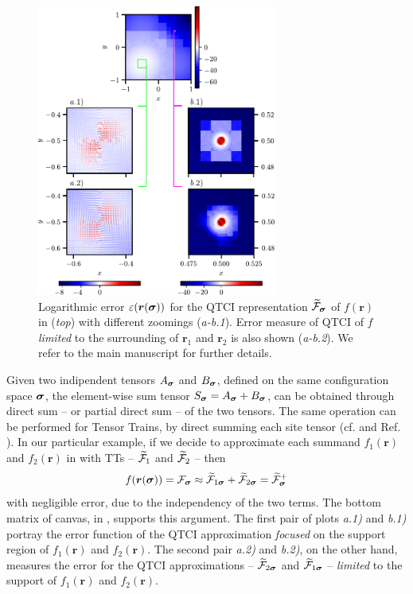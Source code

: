 \begin{figure}[ht!]
	\centering
	\includegraphics[width=0.7\textwidth]{figures/Error_heatmap_localFunc.pdf}
	\caption{Logarithmic error $\varepsilon(\boldsymbol{r}(\boldsymbol{\sigma}))$ for the QTCI representation $\widetilde{\mathcal{F}}_{\boldsymbol{\sigma}}$ of $f(\boldsymbol{r})$ in  (\textit{top}) with different zoomings (\textit{a-b.1}). Error measure of QTCI of $f$ \textit{limited} to the surrounding of $\boldsymbol{r}_1$ and $\boldsymbol{r}_2$ is also shown (\textit{a-b.2}). We refer to the main manuscript for further details. }
	\label{fig:errorLocalFunc}
\end{figure}

Given two indipendent tensors $A_{\boldsymbol{\sigma}}$ and 
$B_{\boldsymbol{\sigma}}$, defined on the same configuration space $\boldsymbol{\sigma}$, the element-wise sum tensor $S_{\boldsymbol{\sigma}} = A_{\boldsymbol{\sigma}} + B_{\boldsymbol{\sigma}}$, can be obtained through direct sum -- or partial direct sum -- of the two tensors. The same operation can be performed for Tensor Trains, by direct summing each site tensor (cf.  and Ref. \cite{Lee2018}). 
In our particular example, if we decide to approximate each summand $f_1(\boldsymbol{r})$ and $f_2(\boldsymbol{r})$ in  with TTs -- $\widetilde{\mathcal{F}}_1$ and $\widetilde{\mathcal{F}}_2$ -- then 
\begin{equation}
	f(\boldsymbol{r}(\boldsymbol{\sigma})) = \mathcal{F}_{\boldsymbol{\sigma}} \approx \widetilde{\mathcal{F}}_{1\boldsymbol{\sigma}} + \widetilde{\mathcal{F}}_{2\boldsymbol{\sigma}} = \widetilde{\mathcal{F}}^+_{\boldsymbol{\sigma}}
	\label{eq:localTermsSum}
\end{equation}
with negligible error, due to the independency of the two terms. The bottom matrix of canvas, in , supports this argument. The first pair of plots \textit{a.1)} and \textit{b.1)} portray the error function of the QTCI approximation \textit{focused} on the support region of $f_1(\boldsymbol{r})$ and $f_2(\boldsymbol{r})$. The second pair \textit{a.2)} and \textit{b.2)}, on the other hand, measures the error for the QTCI approximations -- $\widetilde{\mathcal{F}}_{2\boldsymbol{\sigma}}$ and $\widetilde{\mathcal{F}}_{1\boldsymbol{\sigma}}$ -- \textit{limited} \footnotemark to the support of $f_1(\boldsymbol{r})$ and $f_2(\boldsymbol{r})$.

